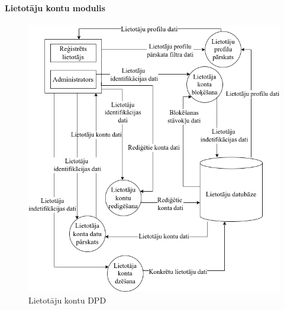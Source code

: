 \paragraph{Lietotāju kontu modulis}

\begin{figure}[htbp]
	\centering
	\includegraphics[width=\linewidth]{./src/img/LietotājuKontuModulis.png}
	\caption{Lietotāju kontu DPD}
	\label{fig:dpd-2-user}
\end{figure}






